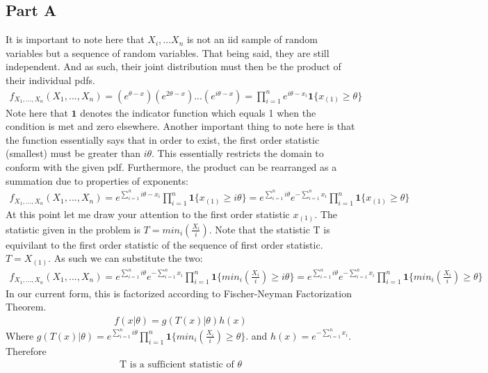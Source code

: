 \documentclass{article}
\begin{document}
\subsection*{Part A}
It is important to note here that $X_i,...X_n$ is not an iid sample of random variables but a sequence of random variables. That being said, they are still independent. And as such, their joint distribution must then be the product of their individual pdfs.
\begin{align*}
f_{X_1,...,X_n}(X_1,...,X_n) = (e^{\theta - x}) (e^{2\theta - x}) ... (e^{i\theta - x}) = \prod_{i=1}^{n} e^{i\theta - x_i} \mathbf{1}\{x_{(1)} \geq \theta\}
\end{align*}
Note here that $\mathbf{1}$ denotes the indicator function which equals 1 when the condition is met and zero elsewhere. Another important thing to note here is that the function essentially says that in order to exist, the first order statistic (smallest) must be greater than $i\theta$. This essentially restricts the domain to conform with the given pdf. Furthermore, the product can be rearranged as a summation due to properties of exponents:
\begin{align*}
f_{X_1,...,X_n}(X_1,...,X_n) = e^{\sum_{i=1}^{n} i\theta - x_i} \prod_{i=1}^{n} \mathbf{1}\{x_{(1)} \geq i\theta\} = e^{\sum_{i=1}^{n}i\theta} e^{-\sum_{i=1}^{n} x_i} \prod_{i=1}^{n} \mathbf{1}\{x_{(1)} \geq \theta\}
\end{align*}
At this point let me draw your attention to the first order statistic $x_{(1)}$. The statistic given in the problem is $T = min_i(\frac{X_i}{i})$. Note that the statistic T is equivilant to the first order statistic of the sequence of first order statistic. $T=X_{(1)}$. As such we can substitute the two:
\begin{align*}
f_{X_1,...,X_n}(X_1,...,X_n) = e^{\sum_{i=1}^{n}i\theta} e^{-\sum_{i=1}^{n} x_i} \prod_{i=1}^{n} \mathbf{1}\{min_i(\frac{X_i}{i}) \geq i\theta\} = e^{\sum_{i=1}^{n}i\theta} e^{-\sum_{i=1}^{n} x_i} \prod_{i=1}^{n} \mathbf{1}\{min_i(\frac{X_i}{i}) \geq \theta\}
\end{align*}
In our current form, this is factorized according to Fischer-Neyman Factorization Theorem.
\begin{align*}
f(x|\theta) = g(T(x)|\theta)h(x)
\end{align*}
Where $g(T(x)|\theta) = e^{\sum_{i=1}^{n}i\theta} \prod_{i=1}^{n} \mathbf{1}\{min_i(\frac{X_i}{i}) \geq \theta\}$. and $h(x)=e^{-\sum_{i=1}^{n} x_i}$. Therefore
\begin{align*}
\boxed{ \text{T is a sufficient statistic of } \theta }
\end{align*}
\end{document}
